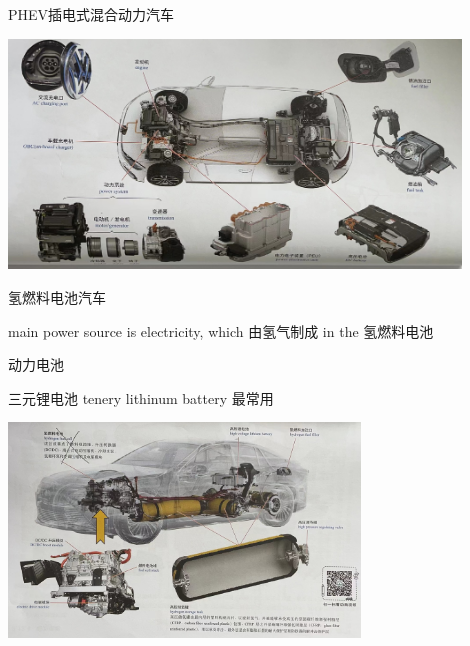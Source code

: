 \begin{frame}
	\begin{block}{}
		\begin{compactitem}
			\item  PHEV插电式混合动力汽车
			\begin{center}
				\includegraphics[width=0.9\textwidth]{2-46}
			\end{center}
		\end{compactitem}
	\end{block}
\end{frame}
\begin{frame}
	\begin{block}{}
		\begin{compactitem}
			\item  氢燃料电池汽车
			
			main power source is electricity, which 由氢气制成 in the 氢燃料电池
		\end{compactitem}
	\end{block}
\end{frame}
\begin{frame}
	\begin{block}{动力电池}
		\begin{compactitem}
			\item 三元锂电池 tenery lithinum battery 最常用
			\begin{center}
				\includegraphics[width=0.7\textwidth]{2-47}
			\end{center}
		\end{compactitem}
	\end{block}
\end{frame}
